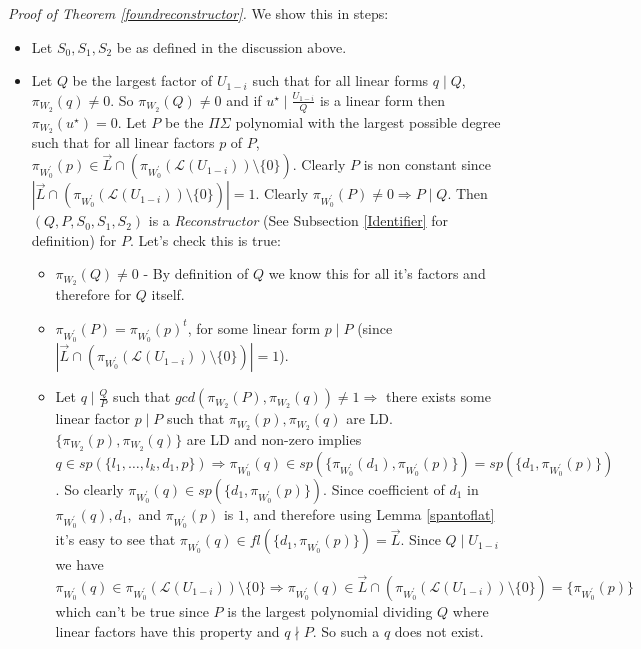 \documentclass[letterpaper,USenglish,numberwithinsect]{lipics}
\newcommand{\ML}{\mathcal{L}}
\begin{document}
\emph{Proof of Theorem \ref{foundreconstructor}.}
We show this in steps:
\begin{itemize}
 \item Let $S_0,S_1,S_2$ be as defined in the discussion above.

\item Let $Q$ be the largest
factor of $U_{1-i}$ such that for all linear forms $q\mid Q$, $\pi_{W_2}(q)\neq
0$.
So $\pi_{W_2}(Q)\neq 0$ and if $u^\star\mid\frac{U_{1-i}}{Q}$ is a linear form
then $\pi_{W_2}(u^\star)=0$.
Let $P$ be the $\Pi\Sigma$ polynomial with the largest
possible degree such that
for all linear factors $p$ of $P$, $\pi_{W_0^\prime}( p) \in
\vec{L} \cap (\pi_{W_0^\prime}(\ML(U_{1-i}))\setminus \{0\})$.
Clearly $P$ is non constant since $|\vec{L} \cap (\pi_{W_0^\prime}(\ML(U_{1-i}))\setminus \{0\})|=1$.
Clearly $\pi_{W_0^\prime}(P)\neq 0 \Rightarrow P\mid Q$.
Then $(Q,P,S_0,S_1,S_2)$ is a \emph{Reconstructor} (See Subsection \ref{Identifier} for definition) for $P$. Let's check
this is true:

\begin{itemize}
\item $\pi_{W_2}(Q) \neq 0$ - By definition of $Q$ we know this for all it's
factors and therefore for $Q$ itself.
\item $\pi_{W_0^\prime}(P) =  \pi_{W_0^\prime}( p)^t$, for some
linear form $p\mid P$ (since $|\vec{L} \cap (\pi_{W_0^\prime}(\ML(U_{1-i}))\setminus \{0\})|=1$).
\item Let $q\mid \frac{Q}{P}$ such that
$gcd(\pi_{W_2}(P), \pi_{W_2}(q)) \neq 1 \Rightarrow$ there exists some
linear factor
$p\mid P$ such that $\pi_{W_2}(p), \pi_{W_2}(q)$ are LD.
 $\{\pi_{W_2}(p), \pi_{W_2}(q)\}$ are LD and non-zero implies
$q\in sp(\{l_1,\ldots,l_k,d_1,p\})
\Rightarrow
\pi_{W_0^\prime}(q)\in
sp(\{\pi_{W_0^\prime}(d_1),\pi_{W_0^\prime}(p)\})=
sp(\{d_1,\pi_{W_0^\prime}( p)\})$.
So clearly $\pi_{W_0^\prime}( q)\in sp(\{d_1,\pi_{W_0^\prime}( p)\})$.
Since coefficient of
 $d_1$ in $\pi_{W_0^\prime}( q),d_1,$ and $\pi_{W_0^\prime}( p)$ is
$1$, and therefore using Lemma \ref{spantoflat} it's
easy to see that
  $\pi_{W_0^\prime}( q)\in fl(\{d_1,\pi_{W_0^\prime}( p)\}) =
\vec L$.
Since $Q\mid U_{1-i}$ we have $\pi_{W_0^\prime}( q) \in
\pi_{W_0^\prime}( {\ML(U_{1-i})}) \setminus \{0\}\Rightarrow \pi_{W_0^\prime}( q) \in
\vec L\cap (\pi_{W_0^\prime}({\ML(U_{1-i})})\setminus \{0\}) =
\{\pi_{W_0^\prime}( p)\}$ which can't be true
since $P$ is the largest polynomial dividing $Q$ where linear factors have this
property and $q\nmid P$. So such a $q$ does not exist.
\end{itemize}
\end{itemize}
\end{document}
